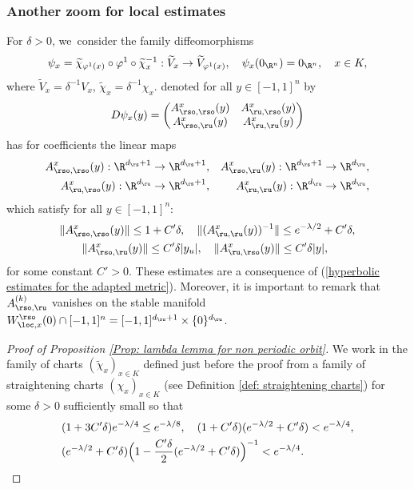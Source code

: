 \begin{appendix}
\subsubsection*{Another zoom for local estimates}
For $\delta > 0$, we~consider the family diffeomorphisms
\[
\psi_{x} = \widetilde{\chi}_{\varphi^1 (x)} \circ \varphi^1 \circ \widetilde{\chi}_x^{-1}: \widetilde{V}_x \to \widetilde{V}_{\varphi^1 (x)}, \quad \psi_{x} (0_{\R^n}) = 0_{\R^n}, \quad x \in K,
\]
where $\widetilde{V}_{x}= \delta^{-1} V_x$, $\widetilde{\chi}_x = \delta^{-1} \chi_x$.
denoted for all $y \in [-1,1]^n$ by
\[
D \psi_{x} (y) = \begin{pmatrix}
A_{\rso,\rso}^{x} (y) & A_{\ru,\rso}^{x} (y) \\
A_{\rso,\ru}^{x} (y) & A_{\ru,\ru}^{x} (y)
\end{pmatrix}
\]
has for coefficients the linear maps
\begin{align*}
A_{\rso,\rso}^{x} (y): \R^{d_\rs + 1} &\to \R^{d_\rs + 1},& A_{\rso,\ru}^{x} (y): \R^{d_\rs + 1} &\to \R^{d_\ru},\\
A_{\ru,\rso}^{x} (y): \R^{d_\ru} &\to \R^{d_\rs + 1},& A_{\ru,\ru}^{x} (y): \R^{d_\ru} &\to \R^{d_\ru},
\end{align*}
which satisfy for all $y \in [-1,1]^n$:
\begin{equation}\label{eq: appendix, estimates differential in adapted chart}
\begin{split}
& \| A_{\rso,\rso}^{x} (y) \|\leq 1 + C' \delta, \quad \| (A_{\ru,\ru}^{x} (y))^{-1} \| \leq e^{- \lambda/2} + C' \delta,\\
&\qquad \| A_{\rso,\ru}^{x} (y) \| \leq C' \delta |y_u|, \quad \| A_{\ru,\rso}^{x} (y) \| \leq C' \delta |y|,
\end{split}
\end{equation}
for some constant $C' > 0$. These estimates are a consequence of (\ref{hyperbolic estimates for the adapted metric}). Moreover, it is important to remark that $A_{\rso,\ru}^{(k)}$ vanishes on the stable manifold $W_{\loc,x}^{\rso} (0) \cap [-1,1]^n = [-1,1]^{d_\rs + 1} \times \{0\}^{d_\ru}$.

\begin{proof}[Proof of Proposition \ref{Prop: lambda lemma for non periodic orbit}]
We work in the family of charts $(\widetilde{\chi}_x)_{x \in K}$ defined just before the proof from a family of straightening charts $(\chi_x)_{x \in K}$ (see Definition \ref{def: straightening charts}) for some $\delta > 0$ sufficiently small so that
\begin{equation}\label{eq: estimees delta preuve lambda lemma}
\begin{split}
&(1 + 3 C' \delta) e^{- \lambda / 4} \leq e^{- \lambda /8}, \quad (1 + C' \delta) (e^{- \lambda/2 } + C' \delta) < e^{- \lambda / 4}, \\
&(e^{-\lambda/ 2} + C' \delta) \Bigl(1 - \frac{C' \delta}{2} (e^{- \lambda/ 2} + C' \delta) \Bigr)^{-1} < e^{- \lambda / 4}.
\end{split}
\end{equation}


\end{proof}
\end{appendix}
